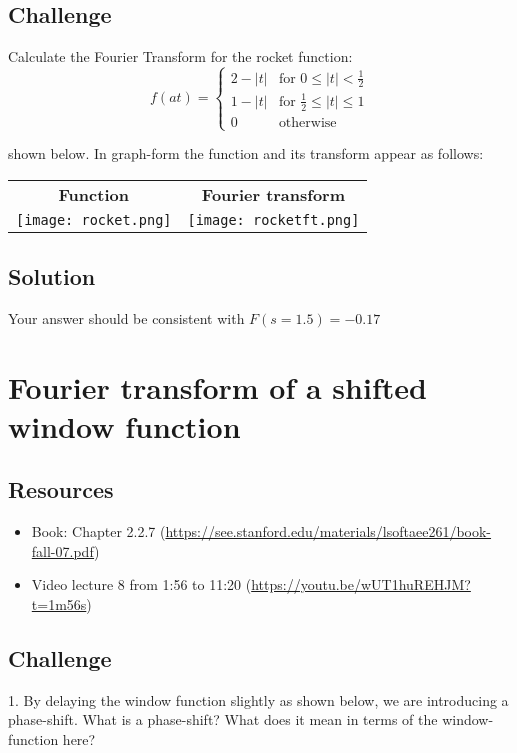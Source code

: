 \subsection*{Challenge}
Calculate the Fourier Transform for the rocket function:
\begin{equation}
    f(at)=
    \begin{cases}
        2 - |t| & \text{for } 0 \le |t| < \frac{1}{2}\\
        1 - |t| & \text{for } \frac{1}{2} \le |t| \le 1\\
        0 & \text{otherwise}
    \end{cases}
\end{equation}
    
shown below. In graph-form the function and its transform appear as follows:

\begin{tabular}{cc}
    \textbf{Function} & \textbf{Fourier transform} \\
    \texttt{[image: rocket.png]} & \texttt{[image: rocketft.png]}
\end{tabular}

\subsection*{Solution}
Your answer should be consistent with $F(s=1.5) = -0.17$




\newpage
\section{Fourier transform of a shifted window function}

\subsection*{Resources}
\begin{itemize}
    \item Book: Chapter 2.2.7 (\url{https://see.stanford.edu/materials/lsoftaee261/book-fall-07.pdf})
    \item Video lecture 8 from 1:56 to 11:20 (\url{https://youtu.be/wUT1huREHJM?t=1m56s})
\end{itemize}

\subsection*{Challenge}
1. By delaying the window function slightly as shown below, we are introducing a phase-shift. What is a phase-shift? What does it mean in terms of the window-function here?

